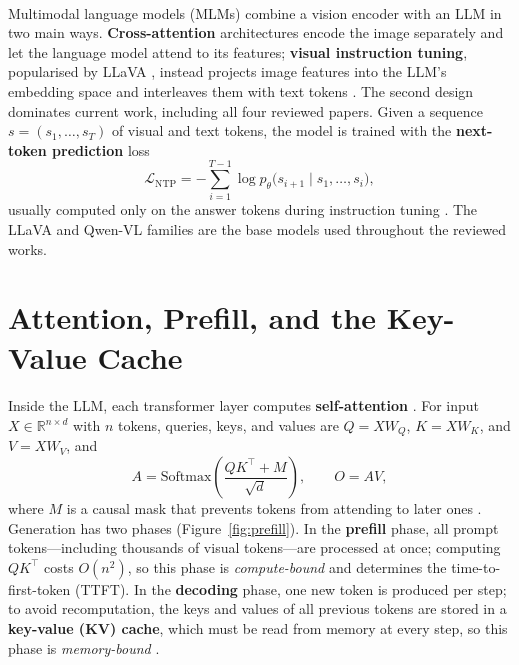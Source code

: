 \documentclass[12pt,a4paper,final]{extreport}
\begin{document}
\paragraph{} Multimodal language models (MLMs) combine a vision encoder with an LLM in two main ways. \textbf{Cross-attention} architectures encode the image separately and let the language model attend to its features; \textbf{visual instruction tuning}, popularised by LLaVA \cite{liu2023}, instead projects image features into the LLM's embedding space and interleaves them with text tokens \cite{p2}. The second design dominates current work, including all four reviewed papers. Given a sequence $s=(s_1,\dots,s_T)$ of visual and text tokens, the model is trained with the \textbf{next-token prediction} loss
\begin{equation}
\mathcal{L}_{\mathrm{NTP}}=-\sum_{i=1}^{T-1}\log p_\theta\big(s_{i+1}\mid s_1,\dots,s_i\big),
\end{equation}
usually computed only on the answer tokens during instruction tuning \cite{p4}. The LLaVA and Qwen-VL families are the base models used throughout the reviewed works.

\section{Attention, Prefill, and the Key-Value Cache}

\paragraph{} Inside the LLM, each transformer layer computes \textbf{self-attention} \cite{vaswani2017}. For input $X\in\mathbb{R}^{n\times d}$ with $n$ tokens, queries, keys, and values are $Q=XW_Q$, $K=XW_K$, and $V=XW_V$, and
\begin{equation}
A=\mathrm{Softmax}\!\left(\frac{QK^{\top}+M}{\sqrt{d}}\right),\qquad O=AV,
\end{equation}
where $M$ is a causal mask that prevents tokens from attending to later ones \cite{p3}. Generation has two phases (Figure~\ref{fig:prefill}). In the \textbf{prefill} phase, all prompt tokens---including thousands of visual tokens---are processed at once; computing $QK^{\top}$ costs $O(n^2)$, so this phase is \emph{compute-bound} and determines the time-to-first-token (TTFT). In the \textbf{decoding} phase, one new token is produced per step; to avoid recomputation, the keys and values of all previous tokens are stored in a \textbf{key-value (KV) cache}, which must be read from memory at every step, so this phase is \emph{memory-bound} \cite{p3}.
\end{document}
